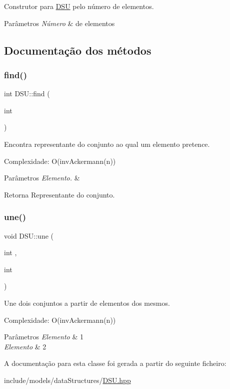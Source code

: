 Construtor para \hyperlink{classDSU}{D\+SU} pelo número de elementos. 
\begin{DoxyParams}{Parâmetros}
{\em Número} & de elementos \\
\hline
\end{DoxyParams}


\subsection{Documentação dos métodos}
\mbox{\label{classDSU_a3915dd627bd9cd0abc6f83e154944961}} 
\subsubsection{\texorpdfstring{find()}{find()}}
{\footnotesize\ttfamily int D\+S\+U\+::find (\begin{DoxyParamCaption}\item[{int}]{ }\end{DoxyParamCaption})}

Encontra representante do conjunto ao qual um elemento pretence.

Complexidade\+: O(inv\+Ackermann(n)) 
\begin{DoxyParams}{Parâmetros}
{\em Elemento.} & \\
\hline
\end{DoxyParams}
\begin{DoxyReturn}{Retorna}
Representante do conjunto. 
\end{DoxyReturn}
\mbox{\label{classDSU_a69728d8ed8c2262f76320ca7238e2f1f}} 
\subsubsection{\texorpdfstring{une()}{une()}}
{\footnotesize\ttfamily void D\+S\+U\+::une (\begin{DoxyParamCaption}\item[{int}]{,  }\item[{int}]{ }\end{DoxyParamCaption})}

Une dois conjuntos a partir de elementos dos mesmos.

Complexidade\+: O(inv\+Ackermann(n)) 
\begin{DoxyParams}{Parâmetros}
{\em Elemento} & 1 \\
\hline
{\em Elemento} & 2 \\
\hline
\end{DoxyParams}


A documentação para esta classe foi gerada a partir do seguinte ficheiro\+:\begin{DoxyCompactItemize}
\item 
include/models/data\+Structures/\hyperlink{DSU_8hpp}{D\+S\+U.\+hpp}\end{DoxyCompactItemize}
